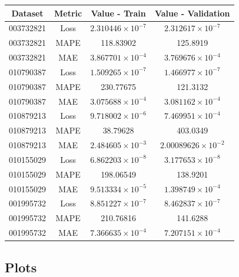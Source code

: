 \documentclass[%
aip,
amsmath,amssymb,
reprint,%
]{revtex4-1}
\begin{document}
\begin{center}
 \begin{tabular}{|c | c | c | c |} 
 \hline
 \textbf{Dataset} & \textbf{Metric} & \textbf{Value - Train} & \textbf{Value - Validation} \\ [0.5 ex]
 \hline
 003732821 & Loss & $2.310446 \times 10^{-7}$ & $2.312617 \times 10^{-7}$ \\ 
 \hline
 003732821 & MAPE & 118.83902 & 125.8919 \\
 \hline
 003732821 & MAE & $3.867701 \times 10^{-4}$ & $3.769676 \times 10^{-4}$ \\
 \hline
 010790387 & Loss & $1.509265 \times 10^{-7}$ & $1.466977 \times 10^{-7}$ \\ 
 \hline
 010790387 & MAPE & 230.77675 & 121.3132 \\
 \hline
 010790387 & MAE & $3.075688 \times 10^{-4}$ & $3.081162 \times 10^{-4}$ \\
 \hline
 010879213 & Loss & $9.718002 \times 10^{-6}$ & $7.469951 \times 10^{-4}$ \\ 
 \hline
 010879213 & MAPE & 38.79628 & 403.0349 \\
 \hline
 010879213 & MAE & $2.484605 \times 10^{-3}$ & $2.00089626 \times 10^{-2}$ \\
 \hline
 010155029 & Loss & $6.862203 \times 10^{-8}$ & $3.177653 \times 10^{-8}$ \\ 
 \hline
 010155029 & MAPE & 198.06549 & 138.9201 \\
 \hline
 010155029 & MAE & $9.513334 \times 10^{-5}$ & $1.398749 \times 10^{-4}$ \\
 \hline
 001995732 & Loss & $8.851227 \times 10^{-7}$ & $8.462837 \times 10^{-7}$ \\ 
 \hline
 001995732 & MAPE & 210.76816 & 141.6288 \\
 \hline
 001995732 & MAE & $7.366635 \times 10^{-4}$ & $7.207151 \times 10^{-4}$ \\[1ex] 
 \hline
\end{tabular}
\end{center}

\subsection{Plots}
\end{document}
